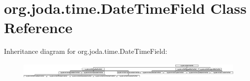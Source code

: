 \hypertarget{classorg_1_1joda_1_1time_1_1_date_time_field}{\section{org.\-joda.\-time.\-Date\-Time\-Field Class Reference}
\label{classorg_1_1joda_1_1time_1_1_date_time_field}
}
Inheritance diagram for org.\-joda.\-time.\-Date\-Time\-Field\-:\begin{figure}[H]
\begin{center}
\leavevmode
\includegraphics[height=0.840841cm]{classorg_1_1joda_1_1time_1_1_date_time_field}
\end{center}
\end{figure}
